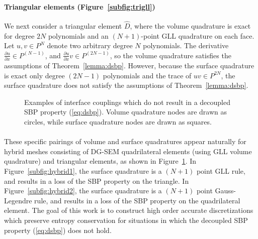 \documentclass{svjour3}                     %
\renewcommand{\hat}{\widehat}
\newcommand{\pd}[2]{\frac{\partial#1}{\partial#2}}
\begin{document}
\paragraph{Triangular elements (Figure~\ref{subfig:trigll})} We next consider a triangular element $\hat{D}$, where the volume quadrature is exact for degree $2N$ polynomials \cite{xiao2010quadrature} and an $(N+1)$-point GLL quadrature on each face.  Let $u,v \in P^N$ denote two arbitrary degree $N$ polynomials.  The derivative $\pd{u}{x} \in P^{(N-1)}$, and $\pd{u}{x}v \in P^{(2N-1)}$, so the volume quadrature satisfies the assumptions of Theorem~\ref{lemma:dsbp}.  However, because the surface quadrature is exact only degree $(2N-1)$ polynomials and the trace of $uv\in P^{2N}$, the surface quadrature does not satisfy the assumptions of Theorem~\ref{lemma:dsbp}.

\begin{figure}
\centering
\begingroup
\captionsetup[subfigure]{width=.425\textwidth}
\endgroup
\hspace{2em}
\caption{Examples of interface couplings which do not result in a decoupled SBP property (\ref{eq:dsbp}). Volume quadrature nodes are drawn as circles, while surface quadrature nodes are drawn as  squares. }
\label{fig:hybrid}
\end{figure}

\paragraph{}These specific pairings of volume and surface quadratures appear naturally for hybrid meshes consisting of DG-SEM quadrilateral elements (using GLL volume quadrature) and triangular elements, as shown in Figure~\ref{fig:hybrid}.  In Figure~\ref{subfig:hybrid1}, the surface quadrature is a $(N+1)$ point GLL rule, and results in a loss of the SBP property on the triangle.  In Figure~\ref{subfig:hybrid2}, the surface quadrature is a $(N+1)$ point Gauss-Legendre rule, and results in a loss of the SBP property on the quadrilateral element.  The goal of this work is to construct high order accurate discretizations which preserve entropy conservation for situations in which the decoupled SBP property (\ref{eq:dsbp}) does not hold.  
\end{document}
